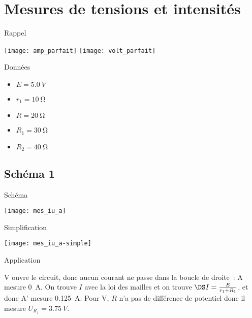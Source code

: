 \documentclass[a4paper, 12pt, final, garamond]{book}
\begin{document}
\section{Mesures de tensions et intensités}
\begin{tcbraster}[raster columns=2, raster equal height=rows]
    \begin{NCrapp}{Rappel}
        \begin{center}
            \texttt{[image: amp\_parfait]}
            \smallbreak
            \texttt{[image: volt\_parfait]}
        \end{center}
    \end{NCrapp}
    \begin{NCdefi}[sidebyside]{Données}
        \begin{itemize}
            \item $E   = \SI{5.0}{V}$
            \item $r_1 = \SI{10}{\ohm}$
            \item $R   = \SI{20}{\ohm}$
        \end{itemize}
        \tcblower
        \begin{itemize}
            \item $R_1 = \SI{30}{\ohm}$
            \item $R_2 = \SI{40}{\ohm}$
        \end{itemize}
    \end{NCdefi}
\end{tcbraster}
\subsection{Schéma 1}
\begin{tcbraster}[raster columns=3, raster equal height=rows]
    \begin{NCdefi}{Schéma}
        \begin{center}
            \hspace*{-12pt}
            \texttt{[image: mes\_iu\_a]}
        \end{center}
    \end{NCdefi}
    \begin{NCimpl}{Simplification}
        \begin{center}
            \hspace*{-12pt}
            \texttt{[image: mes\_iu\_a-simple]}
        \end{center}
    \end{NCimpl}
    \begin{NCexem}{Application}

        V ouvre le circuit, donc aucun courant ne passe dans la boucle de
        droite~: A mesure \SI{0}{A}. On trouve $I$ avec la loi des mailles et on
        trouve $\DS I = \frac{E}{r_1 + R_1}$, et donc A' mesure \SI{0.125}{A}.
        Pour V, $R$ n'a pas de différence de potentiel donc il mesure $U_{R_1}
        = \SI{3.75}{V}$.

    \end{NCexem}
\end{tcbraster}
\end{document}
